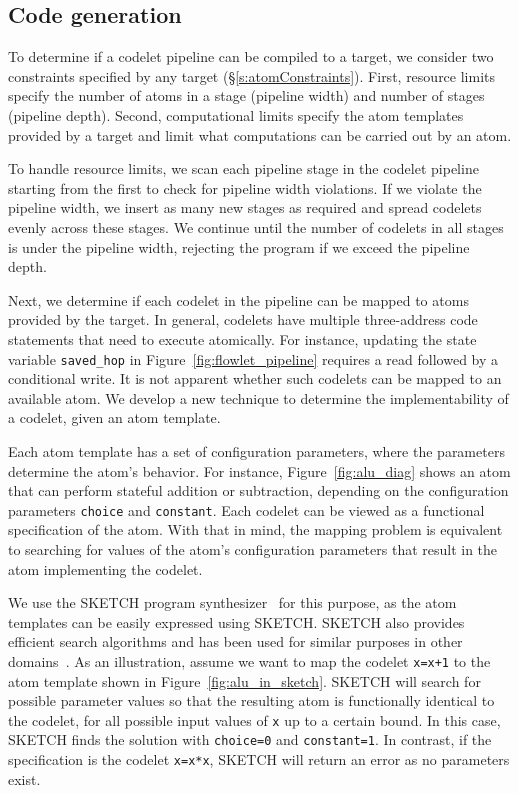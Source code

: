 \subsection{Code generation}
\label{ss:code_gen}

To determine if a codelet pipeline can be compiled to a \absmachine target, we
consider two constraints specified by any \absmachine target
(\S\ref{s:atomConstraints}). First, resource limits specify the number of atoms
in a stage (pipeline width) and number of stages (pipeline depth). Second,
computational limits specify the atom templates provided by a \absmachine
target and limit what computations can be carried out by an atom.

 To handle resource limits, we scan each pipeline
stage in the codelet pipeline starting from the first to check for pipeline
width violations. If we violate the pipeline width, we insert as many new
stages as required and spread codelets evenly across these stages.  We continue
until the number of codelets in all stages is under the pipeline width,
rejecting the program if we exceed the pipeline depth.

 Next, we determine if each codelet in the pipeline
can be mapped to atoms provided by the \absmachine target. In general, codelets
have multiple three-address code statements that need to execute atomically.
For instance, updating the state variable \texttt{saved\_hop} in
Figure~\ref{fig:flowlet_pipeline} requires a read followed by a conditional
write.  It is not apparent whether such codelets can be mapped to an available
atom. We develop a new technique to determine the implementability of a
codelet, given an atom template.

Each atom template has a set of configuration parameters, where the parameters
determine the atom's behavior.  For instance, Figure~\ref{fig:alu_diag} shows
an atom that can perform stateful addition or subtraction, depending on the
configuration parameters {\tt choice} and {\tt constant}.  Each codelet can be
viewed as a functional specification of the atom.  With that in mind, the
mapping problem is equivalent to searching for values of the atom's configuration
parameters that result in the atom implementing the codelet.

We use the SKETCH program synthesizer~\cite{sketch_asplos} for this purpose, as
the atom templates can be easily expressed using SKETCH. SKETCH also provides
efficient search algorithms and has been used for similar purposes in other
domains~\cite{lifejoin, qbs}. As an illustration, assume we want to map the
codelet {\tt x=x+1} to the atom template shown in
Figure~\ref{fig:alu_in_sketch}. SKETCH will search for possible parameter
values so that the resulting atom is functionally identical to the codelet, for
all possible input values of {\tt x} up to a certain bound.  In this case,
SKETCH finds the solution with {\tt choice=0} and {\tt constant=1}.  In
contrast, if the specification is the codelet {\tt x=x*x}, SKETCH will return
an error as no parameters exist.

